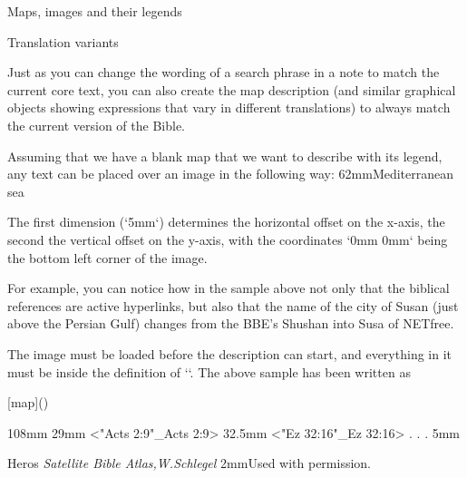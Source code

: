 {{%





\sec[maps] Maps, images and their legends

 Translation variants

Just as you can change the wording of a search phrase in a note to match the current core text, 
you can also create the map description (and similar graphical objects showing expressions that vary in different translations) to always match the current version of the Bible.

Assuming that we have a blank map that we want to describe with its legend, any text can be placed over an image in the following way:
\begtt
\puttext 5mm 62mm{{{\bi Mediterranean sea}}}
\endtt

The first dimension (`5mm`) determines the horizontal offset on the x-axis, the second the vertical offset on the y-axis, with the coordinates `0mm 0mm` being the bottom left corner of the image.





\medskip
\centerline{\picw=200pt  \hss{} } 
\medskip
{}
\medskip
For example, you can notice how in the sample above not only that the biblical references are active hyperlinks, but also that the name of the city of Susan (just above the Persian Gulf) changes from the BBE's  Shushan into Susa of NETfree.

The image must be loaded before the description can start, and everything in it must be inside the definition of `\insertBot`. 
The above sample has been written as

\begtt
{}[map](){
  \Heros \cond {}\rm %
  \vskip-1mm 
\putstext 2mm 108mm {%
  }%
  \LMfonts\sans {}\rm
  \puttext 145mm 29mm {<"Acts 2:9"_Acts 2:9>}
  \puttext 145mm 32.5mm {<"Ez 32:16"_Ez 32:16>}
.
.
.
  \puttext 2mm 5mm{{{{Heros \it Satellite Bible Atlas,\rm W.Schlegel}}
  \puttext 2mm 2mm{\Heros {}\rm Used with permission.}
  }%
\endtt

}}}}

